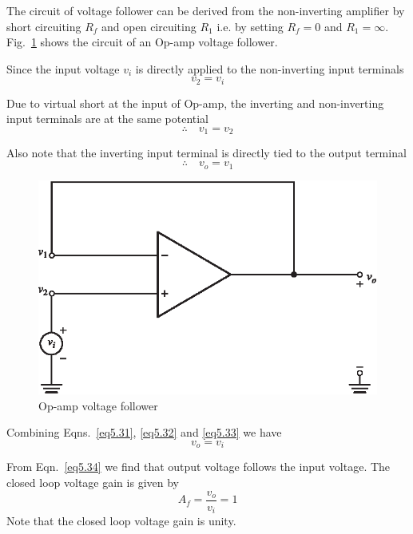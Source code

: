 The circuit of voltage follower can be derived from the non-inverting amplifier by short circuiting $R_{f}$ and open circuiting $R_{1}$ i.e. by setting $R_{f}=0$ and $R_{1}=\infty$. Fig.~\ref{fig5.13} shows the circuit of an Op-amp voltage follower.

Since the input voltage $v_{i}$ is directly applied to the non-inverting input terminals
\begin{equation}
v_{2}=v_{i}\label{eq5.31}
\end{equation}

Due to virtual short at the input of Op-amp, the inverting and non-inverting input terminals are at the same potential
\begin{equation}
\therefore\quad v_{1}=v_{2}\label{eq5.32}
\end{equation}

Also note that the inverting input terminal is directly tied to the output terminal
\begin{equation}
\therefore\quad v_{o}=v_{1}\label{eq5.33}
\end{equation}

\begin{figure}[H]
\centering
\includegraphics{chap4/S3-EE-06-021.eps}
\caption{Op-amp voltage follower}\label{fig5.13}
\end{figure}

Combining Eqns.~\eqref{eq5.31}, \eqref{eq5.32} and \eqref{eq5.33} we have
\begin{equation}
v_{o}=v_{i}\label{eq5.34}
\end{equation}

From Eqn.~\eqref{eq5.34} we find that output voltage follows the input voltage. The closed loop voltage gain is given by
\begin{equation}
A_{f}=\frac{v_{o}}{v_{i}}=1\label{eq5.35}
\end{equation}
Note that the closed loop voltage gain is unity.

